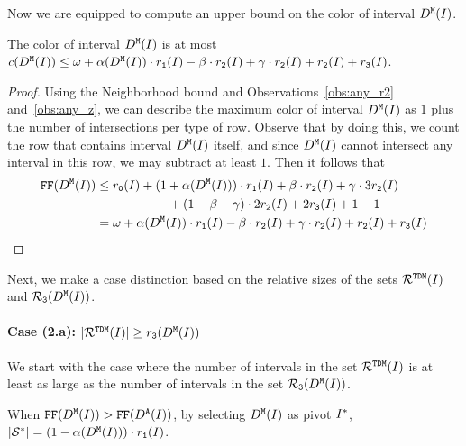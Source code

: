{%
Now we are equipped to compute an upper bound on the color of interval $D^\texttt{M}(I)$.

\begin{lemma}
    \fullversion{\label{lem:any_z}}
    The color of interval $D^\texttt{M}(I)$ is at most $c(D^\texttt{M}(I)) \leq \omega + \alpha(D^\texttt{M}(I)) \cdot r_\texttt{1}(I) - \beta  \cdot r_\texttt{2}(I) + \gamma  \cdot r_\texttt{2}(I)  + r_\texttt{2}(I) + r_\texttt{3}(I)$. 
\end{lemma}

\begin{proof}
    Using the Neighborhood bound and Observations~\ref{obs:any_r2} and~\ref{obs:any_z}, we can describe the maximum color of interval $D^\texttt{M}(I)$ as $1$ plus the number of intersections per type of row.
    Observe that by doing this, we count the row that contains interval $D^\texttt{M}(I)$ itself, and since $D^\texttt{M}(I)$ cannot intersect any interval in this row, we may subtract at least $1$.
    Then it follows that
    \begin{align*}
            \text{\texttt{FF}}(D^\texttt{M}(I)) &\leq r_\texttt{0}(I) + (1 + \alpha(D^\texttt{M}(I))) \cdot r_\texttt{1}(I) + \beta \cdot r_\texttt{2}(I) + \gamma \cdot 3r_\texttt{2}(I) \\&\hspace{2cm}+ (1 - \beta - \gamma) \cdot 2r_\texttt{2}(I) + 2r_\texttt{3}(I) + 1 - 1\\
            &= \omega + \alpha(D^\texttt{M}(I)) \cdot r_\texttt{1}(I) - \beta  \cdot r_\texttt{2}(I) + \gamma \cdot r_\texttt{2}(I) + r_\texttt{2}(I) + r_\texttt{3}(I)
        \end{align*}
\end{proof}


Next, we make a case distinction based on the relative sizes of the sets $\mathcal{R}^{\texttt{TDM}}(I)$ and $\mathcal{R}_\texttt{3}(D^\texttt{M}(I))$.
\paragraph*{Case (2.a): $|\mathcal{R}^{\texttt{TDM}}(I)| \geq r_\texttt{3}(D^\texttt{M}(I))$}
We start with the case where the number of intervals in the set $\mathcal{R}^{\texttt{TDM}}(I)$ is at least as large as the number of intervals in the set $\mathcal{R}_\texttt{3}(D^\texttt{M}(I))$.

\medskip 


\begin{lemma}
    \fullversion{\label{lem:pivotset_z}}
    When $\text{\texttt{FF}}(D^\texttt{M}(I)) > \text{\texttt{FF}}(D^\texttt{A}(I))$, by selecting $D^\texttt{M}(I)$ as pivot $I^*$, $ |\mathcal{S}^*| = (1 - \alpha(D^\texttt{M}(I))) \cdot r_\texttt{1}(I)$.
\end{lemma}

}
